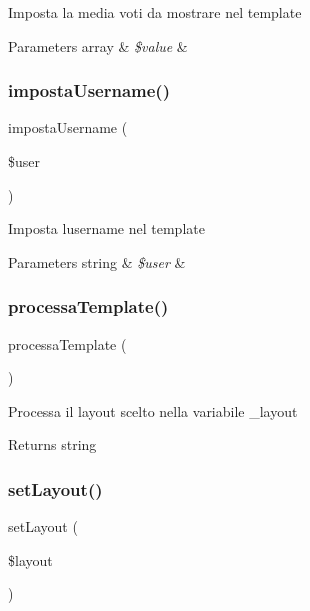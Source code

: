 Imposta la media voti da mostrare nel template


\begin{DoxyParams}[1]{Parameters}
array & {\em \$value} & \\
\hline
\end{DoxyParams}
\mbox{\label{class_v_ricerca_ab16a8f6e348cc54284c9a57bf5d3621e}} 
\subsubsection{\texorpdfstring{imposta\+Username()}{impostaUsername()}}
{\footnotesize\ttfamily imposta\+Username (\begin{DoxyParamCaption}\item[{}]{\$user }\end{DoxyParamCaption})}

Imposta l\textquotesingle{}username nel template


\begin{DoxyParams}[1]{Parameters}
string & {\em \$user} & \\
\hline
\end{DoxyParams}
\mbox{\label{class_v_ricerca_a64bdc484fc7074989b4b2c0ebc63aec2}} 
\subsubsection{\texorpdfstring{processa\+Template()}{processaTemplate()}}
{\footnotesize\ttfamily processa\+Template (\begin{DoxyParamCaption}{ }\end{DoxyParamCaption})}

Processa il layout scelto nella variabile \+\_\+layout

\begin{DoxyReturn}{Returns}
string 
\end{DoxyReturn}
\mbox{\label{class_v_ricerca_a702b3376618a26e6c02c05bae65c6b9e}} 
\subsubsection{\texorpdfstring{set\+Layout()}{setLayout()}}
{\footnotesize\ttfamily set\+Layout (\begin{DoxyParamCaption}\item[{}]{\$layout }\end{DoxyParamCaption})}

